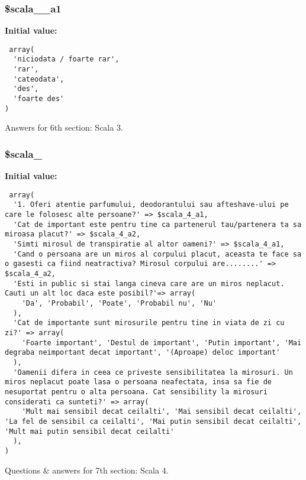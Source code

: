 \subsubsection{\setlength{\rightskip}{0pt plus 5cm}\$scala\_\_\-a1}\label{d1/d7c/a00003_970e8c5d7f5e6f4c7ea6332492f94518}


\textbf{Initial value:}

\begin{Code}\begin{verbatim} array(
  'niciodata / foarte rar', 
  'rar', 
  'cateodata', 
  'des', 
  'foarte des'
)
\end{verbatim}\end{Code}
Answers for 6th section: Scala 3. 

\subsubsection{\setlength{\rightskip}{0pt plus 5cm}\$scala\_}\label{d1/d7c/a00003_d573e18b47819a121c1dd0214672b2c7}


\textbf{Initial value:}

\begin{Code}\begin{verbatim} array(
  '1. Oferi atentie parfumului, deodorantului sau afteshave-ului pe care le folosesc alte persoane?' => $scala_4_a1,
  'Cat de important este pentru tine ca partenerul tau/partenera ta sa miroasa placut?' => $scala_4_a2,
  'Simti mirosul de transpiratie al altor oameni?' => $scala_4_a1,
  'Cand o persoana are un miros al corpului placut, aceasta te face sa o gasesti ca fiind neatractiva? Mirosul corpului are........' => $scala_4_a2,
  'Esti in public si stai langa cineva care are un miros neplacut. Cauti un alt loc daca este posibil?'=> array(
    'Da', 'Probabil', 'Poate', 'Probabil nu', 'Nu'
  ),
  'Cat de importante sunt mirosurile pentru tine in viata de zi cu zi?' => array(
    'Foarte important', 'Destul de important', 'Putin important', 'Mai degraba neimportant decat important', '(Aproape) deloc important'
  ),
  'Oamenii difera in ceea ce priveste sensibilitatea la mirosuri. Un miros neplacut poate lasa o persoana neafectata, insa sa fie de nesuportat pentru o alta persoana. Cat sensibility la mirosuri considerati ca sunteti?' => array(
    'Mult mai sensibil decat ceilalti', 'Mai sensibil decat ceilalti', 'La fel de sensibil ca ceilalti', 'Mai putin sensibil decat ceilalti', 'Mult mai putin sensibil decat ceilalti'
  ),
)
\end{verbatim}\end{Code}
Questions \& answers for 7th section: Scala 4. 

